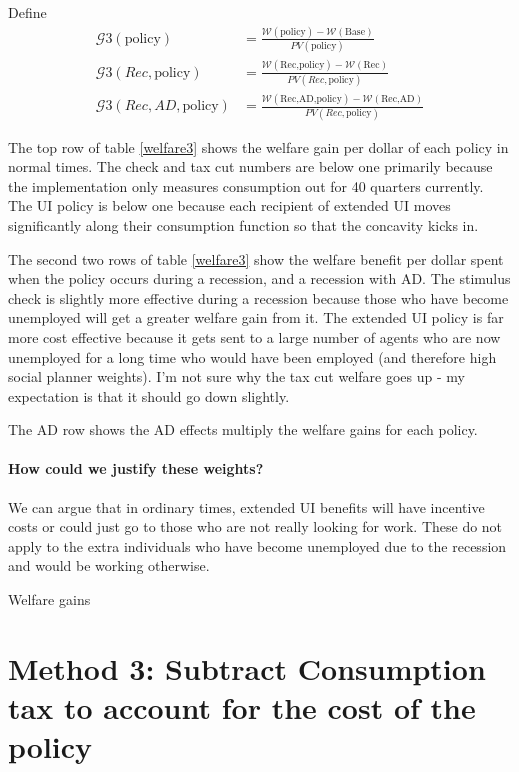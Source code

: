 \documentclass[11pt]{article}
\begin{document}
	Define
	\begin{align}
	\mathcal{G}3(\text{policy}) &= \frac{\mathcal{W}(\text{policy}) - \mathcal{W}(\text{Base})}{PV(\text{policy})} \\
	\mathcal{G}3(Rec,\text{policy}) &= \frac{\mathcal{W}(\text{Rec,policy}) - \mathcal{W}(\text{Rec})}{PV(Rec,\text{policy})} \\
	\mathcal{G}3(Rec,AD,\text{policy}) &= \frac{\mathcal{W}(\text{Rec,AD,policy}) - \mathcal{W}(\text{Rec,AD})}{PV(Rec,\text{policy})}
	\end{align}
	
	The top row of table \ref{welfare3} shows the welfare gain per dollar of each policy in normal times. The check and tax cut numbers are below one primarily because the implementation only measures consumption out for 40 quarters currently. The UI policy is below one because each recipient of extended UI moves significantly along their consumption function so that the concavity kicks in.
	
	The second two rows of table \ref{welfare3} show the welfare benefit per dollar spent when the policy occurs during a recession, and a recession with AD. The stimulus check is slightly more effective during a recession because those who have become unemployed will get a greater welfare gain from it. The extended UI policy is far more cost effective because it gets sent to a large number of agents who are now unemployed for a long time who would have been employed (and therefore high social planner weights). I'm not sure why the tax cut welfare goes up - my expectation is that it should go down slightly.
	
	The AD row shows the AD effects multiply the welfare gains for each policy.
	
	\paragraph{How could we justify these weights?}
	We can argue that in ordinary times, extended UI benefits will have incentive costs or could just go to those who are not really looking for work. These do not apply to the extra individuals who have become unemployed due to the recession and would be working otherwise.
	\begin{table} 
	\center
	
	\caption{Welfare gains}
	\label{welfare3}
	\end{table}
	
\section{Method 3: Subtract Consumption tax to account for the cost of the policy}
\end{document}
